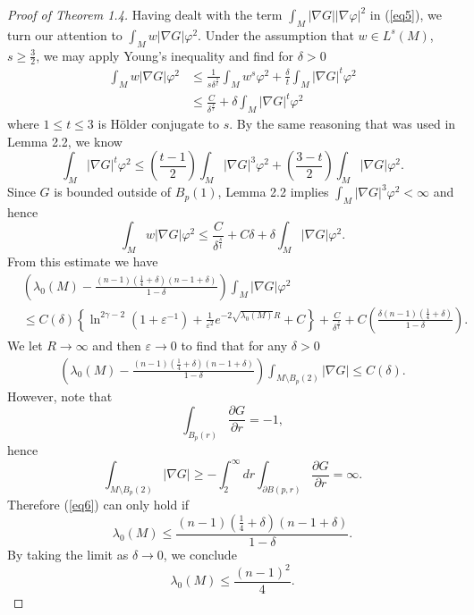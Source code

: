 \documentclass{amsart}
\theoremstyle{definition}
\theoremstyle{remark}
\numberwithin{equation}{section}
\begin{document}
\begin{proof}[Proof of Theorem 1.4]
Having dealt with the term $\int_M|\nabla G||\nabla \varphi|^2$ in (\ref{eq5}), we turn our attention to $\int_Mw|\nabla G|\varphi^2$. Under the assumption that $w\in L^s(M)$, $s\geq\frac{3}{2}$, we may apply Young's inequality and find for $\delta>0$
\begin{align*}
\int_Mw|\nabla G|\varphi^2 &\leq \frac{1}{s\delta^\frac{s}{t}}\int_M w^s\varphi^2 + \frac{\delta}{t}\int_M |\nabla G|^t\varphi^2\\
&\leq \frac{C}{\delta^\frac{s}{t}}+\delta \int_M|\nabla G|^t\varphi^2
\end{align*}
where $1\leq t\leq 3$ is H\"older conjugate to $s$. By the same reasoning that was used in Lemma 2.2, we know
\begin{equation*}
\int_M |\nabla G|^t\varphi^2\leq \left(\frac{t-1}{2}\right)\int_M |\nabla G|^3\varphi^2+\left(\frac{3-t}{2}\right)\int_M|\nabla G|\varphi^2.
\end{equation*}
Since $G$ is bounded outside of $B_p(1)$, Lemma 2.2 implies $\int_M |\nabla G|^3\varphi^2<\infty$ and hence
\begin{equation*}
\int_M w|\nabla G|\varphi^2\leq \frac{C}{\delta^\frac{s}{t}}+C\delta + \delta\int_M |\nabla G|\varphi^2.
\end{equation*}
From this estimate we have
\begin{align*}
&\left(\lambda_0(M)-\frac{(n-1)\left(\frac{1}{4}+\delta\right)(n-1+\delta)}{1-\delta}\right)\int_M |\nabla G|\varphi^2\\
&\leq C(\delta)\left\{\ln^{2\gamma-2}(1+\varepsilon^{-1})+\frac{1}{\varepsilon^2}e^{-2\sqrt{\lambda_0(M)}R}+C\right\}+\frac{C}{\delta^\frac{s}{t}} + C\left(\frac{\delta(n-1)\left(\frac{1}{4}+\delta\right)}{1-\delta}\right).
\end{align*}
We let $R\to\infty$ and then $\varepsilon\to 0$ to find that for any $\delta>0$
\begin{align}\label{eq6}
\left(\lambda_0(M)-\frac{(n-1)\left(\frac{1}{4}+\delta\right)(n-1+\delta)}{1-\delta}\right)\int_{M\setminus B_p(2)} |\nabla G| \leq C(\delta).
\end{align}
However, note that 
\begin{equation*}
\int_{B_p(r)}\frac{\partial G}{\partial r}=-1,
\end{equation*}
hence
\begin{equation*}
\int_{M\setminus B_p(2)}|\nabla G|\geq -\int_2^\infty dr\int_{\partial B(p,r)}\frac{\partial G}{\partial r}=\infty.
\end{equation*}
Therefore (\ref{eq6}) can only hold if
\begin{equation*}
\lambda_0(M)\leq \frac{(n-1)\left(\frac{1}{4}+\delta\right)(n-1+\delta)}{1-\delta}.
\end{equation*}
By taking the limit as $\delta\to 0$, we conclude
\begin{equation*}
\lambda_0(M)\leq \frac{(n-1)^2}{4}.
\end{equation*}
\end{proof}
\end{document}

